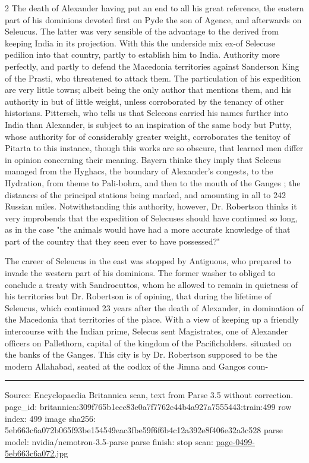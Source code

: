 \documentclass[10pt]{article}
\begin{document}
\begin{multicols}{2}
The death of Alexander having put an end to all his great reference, the eastern part of his dominions devoted first on Pyde the son of Agence, and afterwards on Seleucus. The latter was very sensible of the advantage to the derived from keeping India in its projection. With this the underside mix ex-of Selecuse pedilion into that country, partly to establish him to India. Authority more perfectly, and partly to defend the Macedonia territories against Sanderson King of the Prasti, who threatened to attack them. The particulation of his expedition are very little towns; albeit being the only author that mentions them, and his authority in but of little weight, unless corroborated by the tenancy of other historians. Pittersch, who tells us that Selecons carried his names further into India than Alexander, is subject to an inspiration of the same body but Putty, whose authority for of considerably greater weight, corroborates the tenitoy of Pitarta to this instance, though this works are so obscure, that learned men differ in opinion concerning their meaning. Bayern thinke they imply that Selecus managed from the Hyghacs, the boundary of Alexander’s congests, to the Hydration, from theme to Pali-bohra, and then to the mouth of the Ganges ; the distances of the principal stations being marked, and amounting in all to 242 Russian miles. Notwithstanding this authority, however, Dr. Robertson thinks it very improbends that the expedition of Selecuses should have continued so long, as in the case "the animals would have had a more accurate knowledge of that part of the country that they seen ever to have possessed?"

The career of Seleucus in the east was stopped by Antiguous, who prepared to invade the western part of his dominions. The former washer to obliged to conclude a treaty with Sandrocuttos, whom he allowed to remain in quietness of his territories but Dr. Robertson is of opining, that during the lifetime of Seleucus, which continued 23 years after the death of Alexander, in domination of the Macedonia that territories of the place. With a view of keeping up a friendly intercourse with the Indian prime, Selecus sent Magistrates, one of Alexander officers on Pallethorn, capital of the kingdom of the Pacificholders. situated on the banks of the Ganges. This city is by Dr. Robertson supposed to be the modern Allahabad, seated at the codlox of the Jimna and Gangos coun-

\end{multicols}
\vfill\par\noindent\rule{\linewidth}{0.4pt}\par
{\scriptsize\color{gray}\noindent Source: Encyclopaedia Britannica scan, text from Parse 3.5 without correction. page\_id: britannica:309f765b1ecc83e0a7f7762e44b4a927a7555443:train:499 \quad row index: 499 \quad image sha256: 5eb663c6a072b065f93be154549eac3fbe59f6f6b4c12a392e8f406e32a3c528 \quad parse model: nvidia/nemotron-3.5-parse \quad parse finish: stop \quad scan: \href{../scans/page-0499-5eb663c6a072.jpg}{page-0499-5eb663c6a072.jpg}\par}
\end{document}
